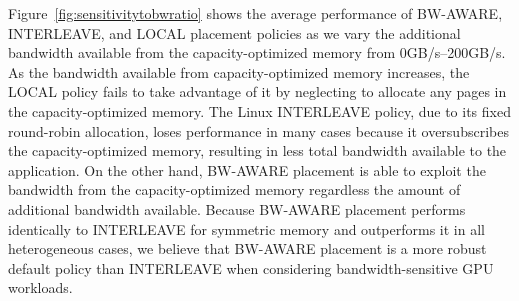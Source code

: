 Figure~\ref{fig:sensitivitytobwratio} shows the average performance of BW-AWARE, INTERLEAVE, and LOCAL
placement policies as we vary the additional bandwidth available from the
capacity-optimized
memory from 0GB/s--200GB/s.
As the bandwidth available from capacity-optimized memory increases, the LOCAL policy
fails to take advantage of it by neglecting to allocate any pages in the capacity-optimized memory.
The Linux INTERLEAVE policy, due to its fixed round-robin allocation, loses performance
in many cases because it oversubscribes the capacity-optimized memory, resulting in less
total bandwidth available to the application.  On the other hand, BW-AWARE placement
is able to exploit the bandwidth from the capacity-optimized memory regardless the 
amount of additional bandwidth available.  Because BW-AWARE placement performs identically to
INTERLEAVE for symmetric memory and outperforms it in all heterogeneous cases, we believe that
BW-AWARE placement is a more robust default policy than INTERLEAVE when considering bandwidth-sensitive 
GPU workloads.
